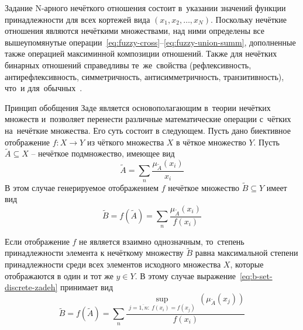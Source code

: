 Задание N-арного нечёткого отношения состоит в~указании значений функции принадлежности для всех кортежей вида $\left(x_1, x_2, \ldots, x_N \right)$. Поскольку нечёткие отношения являются нечёткими множествами, над ними определены все вышеупомянутые операции~\eqref{eq:fuzzy-cross}--\eqref{eq:fuzzy-union-summ}, дополненные также операцией максиминной композиции отношений. Также для нечётких бинарных отношений справедливы те~же~свойства (рефлексивность, антирефлексивность, симметричность, антисимметричность, транзитивность), что~и для~обычных~\cite{Shtovba, Orlovskiy}.

Принцип обобщения Заде является основополагающим в~теории нечётких множеств и~позволяет перенести различные математические операции с~чётких на~нечёткие множества. Его суть состоит в следующем. Пусть дано биективное отображение $f:X\to Y$ из чёткого множества $X$ в чёткое множество $Y$. Пусть $\tilde{A}\subseteq X$ – нечёткое подмножество, имеющее вид
\begin{equation}
\label{eq:a-set-discrete-zadeh}
	\tilde A=\sum\limits_{n} \frac{\mu_{\tilde A}\left( x_i \right)}{x_i}
\end{equation}
В этом случае генерируемое отображением $f$ нечёткое множество $\tilde{B}\subseteq Y$ имеет вид
\begin{equation}
\label{eq:b-set-discrete-zadeh}
	\tilde{B}=f\left( {\tilde{A}} \right)=\sum\limits_{n}{\frac{{{\mu }_{{\tilde{A}}}}\left( {{x}_{i}} \right)}{f\left( {{x}_{i}} \right)}}
\end{equation}

Если отображение $f$ не является взаимно однозначным, то~степень принадлежности элемента к нечёткому множеству $\tilde B$ равна максимальной степени принадлежности среди всех элементов исходного множества $X$, которые отображаются в один и тот же $y\in Y$. В этому случае выражение~\eqref{eq:b-set-discrete-zadeh} принимает вид
\begin{equation}
\label{eq:b-set-zadeh}
	\tilde B=f\left( \tilde A \right)=\sum\limits_{n}{\frac{\underset{j=\overline{1,n}:\ f\left( {{x}_{i}} \right)=f\left( x_j \right)}{\mathop{\sup }}\,\left( {{\mu }_{{\tilde{A}}}}\left( x_j \right) \right)}{f\left( x_i \right)}}
\end{equation}

